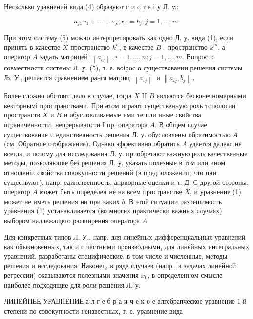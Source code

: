 \documentclass[10pt]{article}
\begin{document}
Несколько уравнений вида (4) образуют с и с т е і у Л. y.:



\[

a_{j 1} x_{1}+\ldots+a_{j n} x_{n}=b_{j}, j=1, \ldots, m .

\]



При этом систему (5) можно интерпретировать как одно Л. у. вида (1), если принять в качестве $X$ пространство $k^{n}$, в качестве $B$ - пространство $k^{m}$, а оператор $A$ задать матрицей $\left\|a_{i j}\right\|, i=1, \ldots, n ; j=1, \ldots, m$. Вопрос о совместности системы Л. у. (5), т. е. воірос о существовании решения системы Љ. У., решается сравнением ранга матриц $\left\|a_{i j}\right\|$ и $\left\|a_{i j}, b_{j}\right\|$.



Более сложно обстоит дело в случае, гогда $X$ II $B$ являются бесконечномерными векторнымі пространствами. При әтом играют существенную роль топологии пространств $X$ и $B$ и обусловливаемые ими те пли иные свойства ограниченности, непрерывности І пр. оператора $A$. В общем случае существование и единственность решения Л. у. обусловлены обратимостью $A$ (см. Обратное отображение). Однако эффективно обратить $A$ удается далеко не всегда, и потому для исследования Л. у. приобретают важную роль качественные методы, позволяюцие без решения Л. у. указать полезные в том или ином отношеніи свойства совокупности решений (в предположенип, что они существуют), напр. единственность, априорные оценки и т. Д. С другой стороны, оператор $A$ может быть определен не на всем пространстве $X$, и уравнение (1) может не иметь решения ни при каких $b$. В этой ситуации разрешимость уравнения (1) устанавливается (во многих практически важных случаях) выбором надлежащего расширения оператора $A$.



Для конкретных типов Л. У., напр. для линейных дифференциальных уравнений как обыкновенных, так и с частными производными, для линейных интегральных уравнений, разработаны специфические, в том числе и численные, методы решения и исследования. Наконец, в ряде случаев (напр., в задачах линейной регрессии) оказываются полезными значения $\tilde{x}_{0}$, в определенном смысле наиболее подходящие для роли решения Л. у.



ЛИНЕЙНЕЕ УРАВНЕНИЕ а л г е б р а и ч е к $о$ е алгебрапческое уравнение 1-й степени по совокупности неизвестных, т. е. уравнение вида
\end{document}
